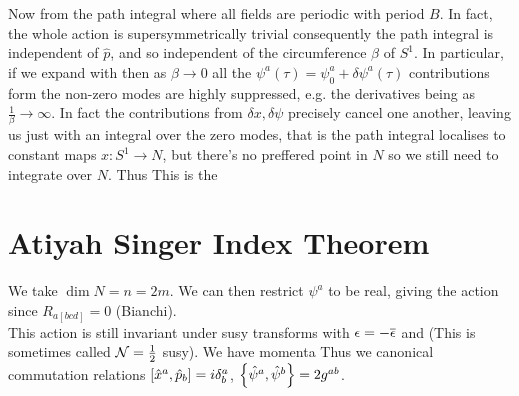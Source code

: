 \documentclass{article}
\begin{document}
Now from the path integral 
where all fields are periodic with period $B$. In fact, the whole action is supersymmetrically trivial 
consequently the path integral is independent of $\hat{p}$, and so independent of  the circumference $\beta$ of $S^1$. In particular, if we expand 
with 
then as $\beta \to 0$ all the $\psi^a(\tau) = \psi_0^a + \delta \psi^a(\tau)$ contributions form the non-zero modes are highly suppressed, e.g. 
the derivatives being as $\frac{1}{\beta} \to \infty$. In fact the contributions from $\delta x, \delta \psi$ precisely cancel one another, leaving us just with an integral over the zero modes, that is the path integral localises to constant maps $x : S^1 \to N$, but there's no preffered point in $N$ so we still need to integrate over $N$. Thus 
This is the 

\section{Atiyah Singer Index Theorem}
We take $\dim N = n = 2m$. We can then restrict $\psi^a$ to be real, giving the action
since $R_{a[bcd]}=0$ (Bianchi). \\
This action is still invariant under susy transforms with $ \eps = - \bar{\eps}$ and 
(This is sometimes called $\mc{N}=\frac{1}{2}$ susy). We have momenta 
Thus we canonical commutation relations $\comm[\hat{x}^a]{\hat{p}_b} = i \delta^a_b$, $\acomm[\hat{\psi}^a]{\hat{\psi}^b} = 2g^{ab}$. 
\end{document}
